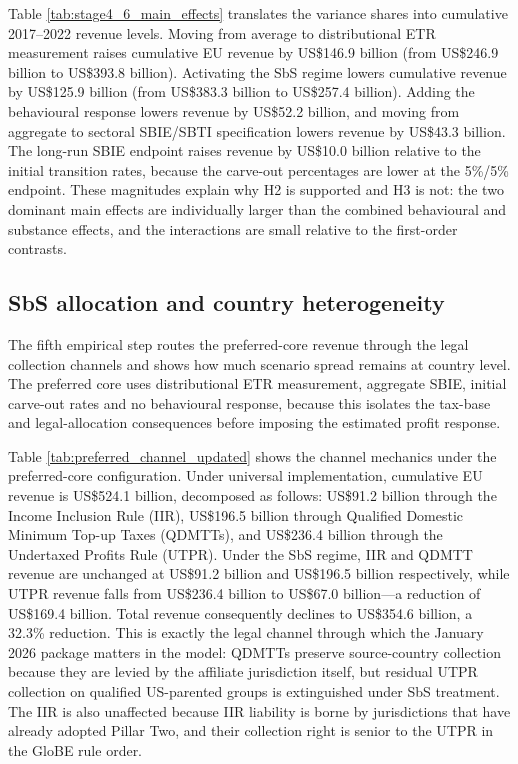 \documentclass[11pt,a4paper]{article}
\begin{document}


Table \ref{tab:stage4_6_main_effects} translates the variance shares into cumulative 2017--2022 revenue levels. Moving from average to distributional ETR measurement raises cumulative EU revenue by US\$146.9 billion (from US\$246.9 billion to US\$393.8 billion). Activating the SbS regime lowers cumulative revenue by US\$125.9 billion (from US\$383.3 billion to US\$257.4 billion). Adding the behavioural response lowers revenue by US\$52.2 billion, and moving from aggregate to sectoral SBIE/SBTI specification lowers revenue by US\$43.3 billion. The long-run SBIE endpoint raises revenue by US\$10.0 billion relative to the initial transition rates, because the carve-out percentages are lower at the 5\%/5\% endpoint. These magnitudes explain why H2 is supported and H3 is not: the two dominant main effects are individually larger than the combined behavioural and substance effects, and the interactions are small relative to the first-order contrasts.


\subsection{SbS allocation and country heterogeneity}\label{sec:results_sbs}

The fifth empirical step routes the preferred-core revenue through the legal collection channels and shows how much scenario spread remains at country level. The preferred core uses distributional ETR measurement, aggregate SBIE, initial carve-out rates and no behavioural response, because this isolates the tax-base and legal-allocation consequences before imposing the estimated profit response.



Table \ref{tab:preferred_channel_updated} shows the channel mechanics under the preferred-core configuration. Under universal implementation, cumulative EU revenue is US\$524.1 billion, decomposed as follows: US\$91.2 billion through the Income Inclusion Rule (IIR), US\$196.5 billion through Qualified Domestic Minimum Top-up Taxes (QDMTTs), and US\$236.4 billion through the Undertaxed Profits Rule (UTPR). Under the SbS regime, IIR and QDMTT revenue are unchanged at US\$91.2 billion and US\$196.5 billion respectively, while UTPR revenue falls from US\$236.4 billion to US\$67.0 billion---a reduction of US\$169.4 billion. Total revenue consequently declines to US\$354.6 billion, a 32.3\% reduction. This is exactly the legal channel through which the January 2026 package matters in the model: QDMTTs preserve source-country collection because they are levied by the affiliate jurisdiction itself, but residual UTPR collection on qualified US-parented groups is extinguished under SbS treatment. The IIR is also unaffected because IIR liability is borne by jurisdictions that have already adopted Pillar Two, and their collection right is senior to the UTPR in the GloBE rule order.
\end{document}
